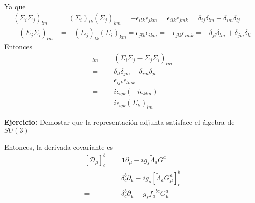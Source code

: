 Ya que
\begin{align}
  \label{eq:167}
  (\Sigma_i\Sigma_j)_{lm}&=(\Sigma_i)_{lk}(\Sigma_j)_{km}=-\epsilon_{ilk}\epsilon_{jkm}=\epsilon_{ilk}\epsilon_{jmk}=\delta_{ij}\delta_{lm}-\delta_{im}\delta_{lj}\nonumber\\
  -(\Sigma_j\Sigma_i)_{lm}&=-(\Sigma_j)_{lk}(\Sigma_i)_{km}=\epsilon_{jlk}\epsilon_{ikm}=-\epsilon_{jlk}\epsilon_{imk}=-\delta_{ji}\delta_{lm}+\delta_{jm}\delta_{li}
\end{align}
Entonces
\begin{align}
[\Sigma_i,\Sigma_j]_{lm}=& (\Sigma_i\Sigma_j-\Sigma_j\Sigma_i)_{lm}\nonumber\\
=&\delta_{il}\delta_{jm}-\delta_{im}\delta_{jl}\nonumber\\
=&\epsilon_{ijk}\epsilon_{lmk}\nonumber\\
=&i\epsilon_{ijk}(-i\epsilon_{klm})\nonumber\\
=&i\epsilon_{ijk}(\Sigma_k)_{lm}
\end{align}


\textbf{Ejercicio:} Demostar que la representación adjunta satisface el álgebra de $SU(3)$


Entonces, la derivada covariante es
\begin{align}
  \left[\mathcal{D}_{\mu} \right]^b_c=& \mathbf{1}\partial_{\mu}-ig_s \widetilde{\Lambda}_a G^a \nonumber\\
=&\delta^b_c\partial_{\mu}-i g_{s}\left[ \widetilde{\Lambda}_{a} G^a_{\mu} \right]^b_c \nonumber\\
                  =&\delta^b_c\partial_{\mu}- g_{s} {f_{a}}^{bc}  G^a_{\mu} \nonumber\\
\end{align}


